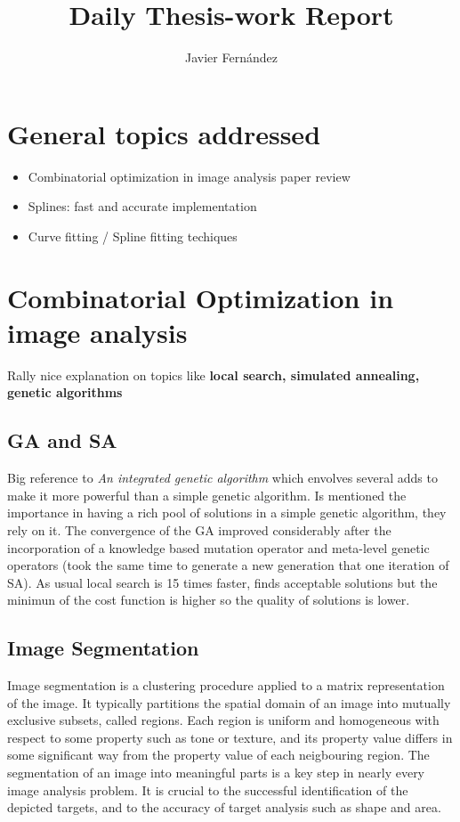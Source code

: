 \documentclass{article}
\title{Daily Thesis-work Report}
\author{Javier Fern\'andez}
\begin{document}
\maketitle

\section{General topics addressed}

\begin{itemize}
\item Combinatorial optimization in image analysis paper review
\item Splines: fast and accurate implementation
\item Curve fitting / Spline fitting techiques
\end{itemize}

\section{Combinatorial Optimization in image analysis}
Rally nice explanation on topics like \textbf{local search, simulated annealing, genetic algorithms}\\


\subsection*{GA and SA}

Big reference to \emph{An integrated genetic algorithm} which envolves several adds to make it
more powerful than a simple genetic algorithm. Is mentioned the importance in having
a rich pool of solutions in a simple genetic algorithm, they rely on it. The convergence of the
GA improved considerably after the incorporation of a knowledge based mutation operator and 
meta-level genetic operators (took the same time to generate a new generation that one iteration
of SA). As usual local search is 15 times faster, finds acceptable solutions but the minimun
of the cost function is higher so the quality of solutions is lower.\\


\subsection*{Image Segmentation}
Image segmentation is a clustering procedure applied to a matrix representation of the
image. It typically partitions the spatial domain of an image into mutually exclusive
subsets, called regions. Each region is uniform and homogeneous with respect to some
property such as tone or texture, and its property value differs in some significant way
from the property value of each neigbouring region. The segmentation of an image into
meaningful parts is a key step in nearly every image analysis problem. It is crucial to the
successful identification of the depicted targets, and to the accuracy of target analysis such
as shape and area.
\end{document}
